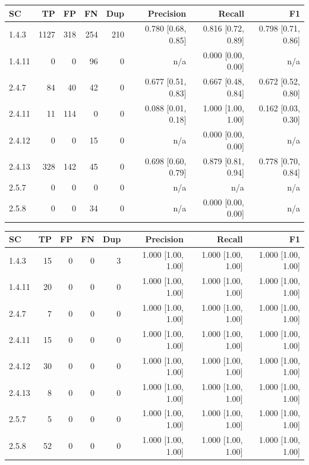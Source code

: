 \begin{tabular}{lrrrrrrr}
\hline
SC & TP & FP & FN & Dup & Precision & Recall & F1 \\
\hline
1.4.3 & 1127 & 318 & 254 & 210 & 0.780 [0.68, 0.85] & 0.816 [0.72, 0.89] & 0.798 [0.71, 0.86] \\
1.4.11 & 0 & 0 & 96 & 0 & n/a & 0.000 [0.00, 0.00] & n/a \\
2.4.7 & 84 & 40 & 42 & 0 & 0.677 [0.51, 0.83] & 0.667 [0.48, 0.84] & 0.672 [0.52, 0.80] \\
2.4.11 & 11 & 114 & 0 & 0 & 0.088 [0.01, 0.18] & 1.000 [1.00, 1.00] & 0.162 [0.03, 0.30] \\
2.4.12 & 0 & 0 & 15 & 0 & n/a & 0.000 [0.00, 0.00] & n/a \\
2.4.13 & 328 & 142 & 45 & 0 & 0.698 [0.60, 0.79] & 0.879 [0.81, 0.94] & 0.778 [0.70, 0.84] \\
2.5.7 & 0 & 0 & 0 & 0 & n/a & n/a & n/a \\
2.5.8 & 0 & 0 & 34 & 0 & n/a & 0.000 [0.00, 0.00] & n/a \\
\hline
\end{tabular}

\begin{tabular}{lrrrrrrr}
\hline
SC & TP & FP & FN & Dup & Precision & Recall & F1 \\
\hline
1.4.3 & 15 & 0 & 0 & 3 & 1.000 [1.00, 1.00] & 1.000 [1.00, 1.00] & 1.000 [1.00, 1.00] \\
1.4.11 & 20 & 0 & 0 & 0 & 1.000 [1.00, 1.00] & 1.000 [1.00, 1.00] & 1.000 [1.00, 1.00] \\
2.4.7 & 7 & 0 & 0 & 0 & 1.000 [1.00, 1.00] & 1.000 [1.00, 1.00] & 1.000 [1.00, 1.00] \\
2.4.11 & 15 & 0 & 0 & 0 & 1.000 [1.00, 1.00] & 1.000 [1.00, 1.00] & 1.000 [1.00, 1.00] \\
2.4.12 & 30 & 0 & 0 & 0 & 1.000 [1.00, 1.00] & 1.000 [1.00, 1.00] & 1.000 [1.00, 1.00] \\
2.4.13 & 8 & 0 & 0 & 0 & 1.000 [1.00, 1.00] & 1.000 [1.00, 1.00] & 1.000 [1.00, 1.00] \\
2.5.7 & 5 & 0 & 0 & 0 & 1.000 [1.00, 1.00] & 1.000 [1.00, 1.00] & 1.000 [1.00, 1.00] \\
2.5.8 & 52 & 0 & 0 & 0 & 1.000 [1.00, 1.00] & 1.000 [1.00, 1.00] & 1.000 [1.00, 1.00] \\
\hline
\end{tabular}

